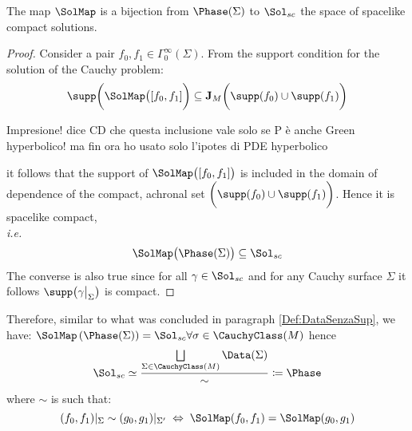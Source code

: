 \documentclass[Main]{subfiles}
\begin{document}
			\begin{proposition}
				The map $\SolMap$ is a bijection from $\Phase(\Sigma)$ to $\Sol_{sc}$ the space of spacelike compact solutions.			
			\end{proposition}
			\begin{proof}
				Consider a pair $f_0, f_1 \in \Gamma_0^\infty(\Sigma)$. From the support condition for the solution of the Cauchy problem:
				\begin{equation}\label{Eq:SupportoCauchySol}
					\supp\biggr( \SolMap \big([f_0,f_1] \biggr) \subseteq \mathbf{J}_M \biggr( \supp(f_0) \cup \supp(f_1) \biggr)
				\end{equation}
%				
\ifToninus
	\begin{Warning}
		Impresione! dice CD che questa inclusione vale solo se P è anche Green hyperbolico! ma fin ora ho usato solo l'ipotes di PDE hyperbolico
	\end{Warning}				
\fi
%				
				it follows that the support of $\SolMap \big([f_0,f_1]\big) $	is included in the domain of dependence of the compact, achronal	set $\biggr( \supp(f_0) \cup \supp(f_1) \biggr)$.
				Hence it is spacelike compact,\\ \textit{i.e.}
				\begin{displaymath}
					\SolMap \big( \Phase(\Sigma)\big) \subseteq \Sol_{sc}
				\end{displaymath}
				The converse is also true since for all $\gamma \in \Sol_{sc}$ and for any Cauchy surface $\Sigma$ it follows $\supp\big( \gamma \big\vert_\Sigma \big)$ is compact.
			\end{proof}
			Therefore, similar to what was concluded in paragraph  \ref{Def:DataSenzaSup}, we have:
			$ \SolMap \left( \Phase(\Sigma) \right) = \Sol_{sc} \forall \sigma \in \CauchyClass(M)$
			hence
			\begin{equation}
				\Sol_{sc} \simeq \frac{\bigsqcup\limits_{\Sigma \in \CauchyClass(M)}\Data(\Sigma)}{\sim} \coloneqq \Phase
			\end{equation}
				where $\sim$ is such that:
				\begin{displaymath}
					(f_0, f_1)|_\Sigma \sim (g_0, g_1)|_{\Sigma'} \; \Leftrightarrow \; \SolMap(f_0,f_1) =  \SolMap(g_0,g_1) 
				\end{displaymath}
\end{document}
